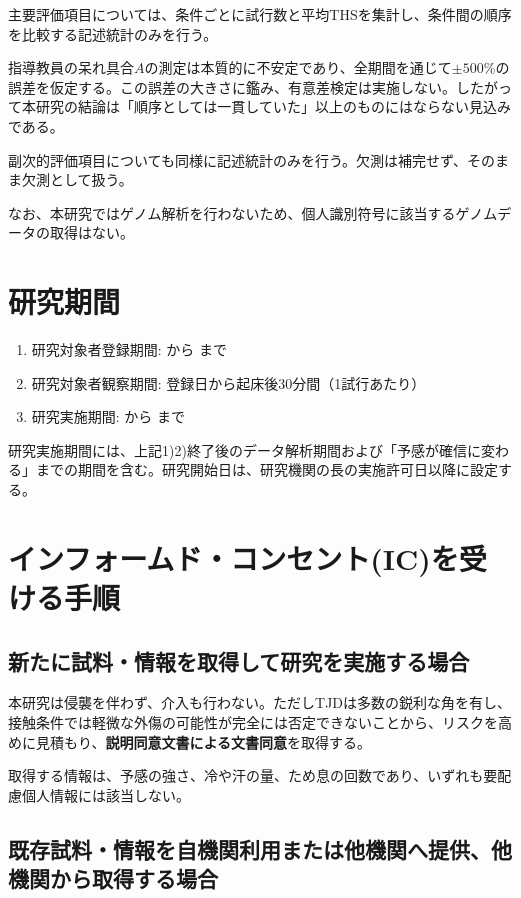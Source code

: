\documentclass{kyodai-protocol}
\begin{document}
主要評価項目については、条件ごとに試行数と平均THSを集計し、条件間の順序を比較する記述統計のみを行う。

指導教員の呆れ具合$A$の測定は本質的に不安定であり、全期間を通じて$\pm 500$\%の誤差を仮定する。この誤差の大きさに鑑み、有意差検定は実施しない。したがって本研究の結論は「順序としては一貫していた」以上のものにはならない見込みである。

副次的評価項目についても同様に記述統計のみを行う。欠測は補完せず、そのまま欠測として扱う。

なお、本研究ではゲノム解析を行わないため、個人識別符号に該当するゲノムデータの取得はない。

\section{研究期間}
\label{sec:period}

\begin{enumerate}
\item 研究対象者登録期間: \EnrollmentStart から \EnrollmentEnd まで
\item 研究対象者観察期間: 登録日から起床後30分間（1試行あたり）
\item 研究実施期間: \StudyStart から \StudyEnd まで
\end{enumerate}

研究実施期間には、上記1)2)終了後のデータ解析期間および「予感が確信に変わる」までの期間を含む。研究開始日は、研究機関の長の実施許可日以降に設定する。

\section{インフォームド・コンセント(IC)を受ける手順}
\label{sec:ic}

\subsection{新たに試料・情報を取得して研究を実施する場合}

本研究は侵襲を伴わず、介入も行わない。ただしTJDは多数の鋭利な角を有し、接触条件では軽微な外傷の可能性が完全には否定できないことから、リスクを高めに見積もり、\textbf{説明同意文書による文書同意}を取得する。

取得する情報は、予感の強さ、冷や汗の量、ため息の回数であり、いずれも要配慮個人情報には該当しない。

\subsection{既存試料・情報を自機関利用または他機関へ提供、他機関から取得する場合}
\end{document}
